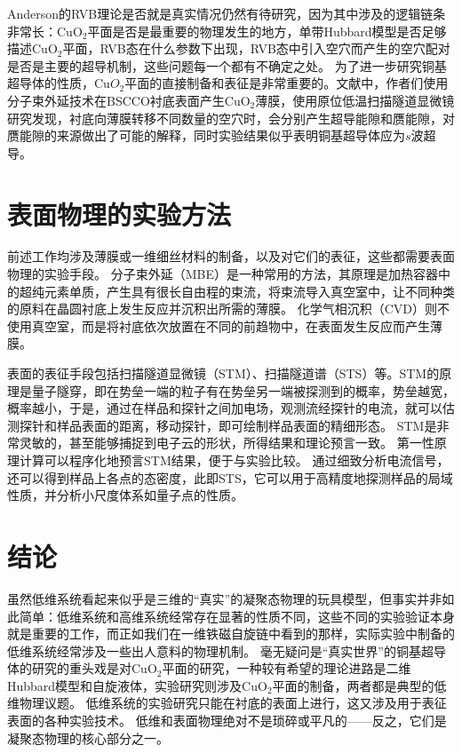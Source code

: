 \documentclass[hyperref, UTF8]{ctexart}
\begin{document}
Anderson的RVB理论是否就是真实情况仍然有待研究，因为其中涉及的逻辑链条非常长：CuO$_2$平面是否是最重要的物理发生的地方，单带Hubbard模型是否足够描述CuO$_2$平面，RVB态在什么参数下出现，RVB态中引入空穴而产生的空穴配对是否是主要的超导机制，这些问题每一个都有不确定之处。
为了进一步研究铜基超导体的性质，Cu$O_2$平面的直接制备和表征是非常重要的。文献\cite{zhong2016nodeless}中，作者们使用分子束外延技术在BSCCO衬底表面产生CuO$_2$薄膜，使用原位低温扫描隧道显微镜研究发现，衬底向薄膜转移不同数量的空穴时，会分别产生超导能隙和赝能隙，对赝能隙的来源做出了可能的解释，同时实验结果似乎表明铜基超导体应为$s$波超导。

\section{表面物理的实验方法}

前述工作均涉及薄膜或一维细丝材料的制备，以及对它们的表征，这些都需要表面物理的实验手段。
分子束外延（MBE）是一种常用的方法，其原理是加热容器中的超纯元素单质，产生具有很长自由程的束流，将束流导入真空室中，让不同种类的原料在晶圆衬底上发生反应并沉积出所需的薄膜\cite{cho1975molecular}。
化学气相沉积（CVD）则不使用真空室，而是将衬底依次放置在不同的前趋物中，在表面发生反应而产生薄膜\cite{pierson1999handbook}。

表面的表征手段包括扫描隧道显微镜（STM）、扫描隧道谱（STS）等。STM的原理是量子隧穿，即在势垒一端的粒子有在势垒另一端被探测到的概率，势垒越宽，概率越小，于是，通过在样品和探针之间加电场，观测流经探针的电流，就可以估测探针和样品表面的距离，移动探针，即可绘制样品表面的精细形态。
STM是非常灵敏的，甚至能够捕捉到电子云的形状，所得结果和理论预言一致\cite{stm-cloud}。
第一性原理计算可以程序化地预言STM结果，便于与实验比较\cite{vasp-stm}。
通过细致分析电流信号，还可以得到样品上各点的态密度，此即STS，它可以用于高精度地探测样品的局域性质，并分析小尺度体系如量子点的性质。

\section{结论}

虽然低维系统看起来似乎是三维的“真实”的凝聚态物理的玩具模型，但事实并非如此简单：低维系统和高维系统经常存在显著的性质不同，这些不同的实验验证本身就是重要的工作，而正如我们在一维铁磁自旋链中看到的那样，实际实验中制备的低维系统经常涉及一些出人意料的物理机制。
毫无疑问是“真实世界”的铜基超导体的研究的重头戏是对CuO$_2$平面的研究，一种较有希望的理论进路是二维Hubbard模型和自旋液体，实验研究则涉及CuO$_2$平面的制备，两者都是典型的低维物理议题。
低维系统的实验研究只能在衬底的表面上进行，这又涉及用于表征表面的各种实验技术。
低维和表面物理绝对不是琐碎或平凡的——反之，它们是凝聚态物理的核心部分之一。



\end{document}
